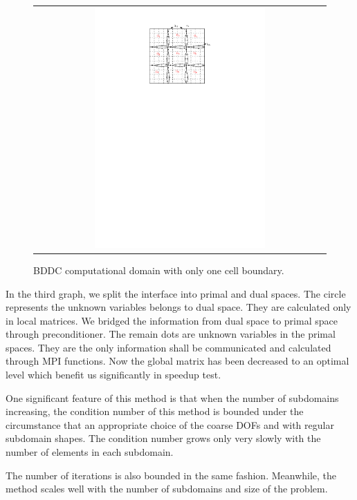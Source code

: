 \begin{figure}[h]
	\centering
	\begin{tabular}{c}
		\includegraphics[width=0.6\textwidth]{./pics/domain3.pdf}
	\end{tabular}
	\caption{\footnotesize BDDC computational domain with only one cell boundary.}\label{fig5: domain2}
\end{figure}

In the third graph, we split the interface into primal and dual spaces. The circle represents the unknown variables belongs to dual space. They are calculated only in local matrices. We bridged the information from dual space to primal space through preconditioner. The remain dots are unknown variables in the primal spaces. They are the only information shall be communicated and calculated through MPI functions. Now the global matrix has been decreased to an optimal level which benefit us significantly in speedup test. 

One significant feature of this method is that when the number of subdomains increasing, the condition number of this method is bounded under the circumstance that an appropriate choice of the coarse DOFs and with regular subdomain shapes. The condition number grows only very slowly with the number of elements in each subdomain.

The number of iterations is also bounded in the same fashion. Meanwhile, the method scales well with the number of subdomains and size of the problem. 

